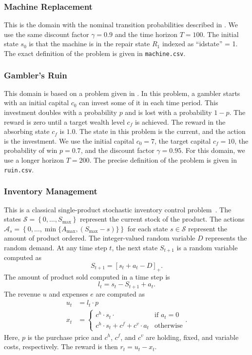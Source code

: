 \documentclass[twoside]{article}
\newcommand{\states}{\mathcal{S}}
\newcommand{\actions}{\mathcal{A}}
\theoremstyle{plain}
\theoremstyle{definition}
\theoremstyle{remark}
\renewcommand{\cite}[1]{\citep{#1}}
\begin{document}
\subsubsection{Machine Replacement}

This is the domain with the nominal transition probabilities described in \cite{Delage2009}. We use the same discount factor $\gamma = 0.9$ and the time horizon $T=100$. The initial state $s_0$ is that the machine is in the repair state $R_1$ indexed as ``idstate'' = 1. The exact definition of the problem is given in \texttt{machine.csv}.

\subsubsection{Gambler's Ruin}

This domain is based on a problem given in \cite{Bauerle2011}. In this problem, a gambler starts with an initial capital $c_0$ can invest some of it in each time period. This investment doubles with a probability $p$ and is lost with a probability $1-p$. The reward is zero until a target wealth level $c_f$ is achieved. The reward in the absorbing state $c_f$ is $1.0$. The state in this problem is the current, and the action is the investment. We use the initial capital $c_0 = 7$, the target capital $c_f = 10$, the probability of win $p = 0.7$, and the discount factor $\gamma = 0.95$. For this domain, we use a longer horizon $T = 200$. The precise definition of the problem is given in \texttt{ruin.csv}.

\subsubsection{Inventory Management}

This is a classical single-product stochastic inventory control problem~\cite{Puterman2005}. The states $\states  = \left\{ 0, \dots , S_{\max} \right\}$ represent the current stock of the product. The actions $\actions_s = \left\{ 0, \dots, \min\{A_{\max},(S_{\max}-s) \} \right\}$ for each state $s\in \states $ represent the amount of product ordered. The integer-valued random variable $D$ represents the random demand. At any time step $t$, the next state $S_{t+1}$ is a random variable computed as 
\[
  S_{t+1} = \left[ s_t + a_t - D \right]_+.
\]
The amount of product sold computed in a time step is
\[
    l_t = s_t - S_{t+1} + a_t.
\]
The revenue $u$  and expenses $e$ are computed as
\begin{align*}
  u_t &= l_t \cdot p  \\
  x_t &=
    \begin{cases}
      c^h \cdot  s_t \cdot  & \text{if } a_t = 0 \\
      c^h \cdot s_t + c^f + c^v \cdot a_t & \text{otherwise}
    \end{cases}.
\end{align*}
Here, $p$ is the purchase price and $c^h$, $c^f$, and $c^v$ are holding, fixed, and variable costs, respectively. The reward is then $r_t = u_t - x_t$.
\end{document}
